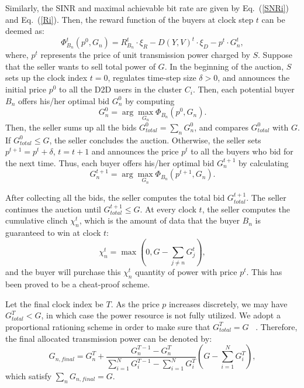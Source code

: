 \documentclass[11pt,draftcls]{IEEEtran}{\onecolumn}
\begin{document}
Similarly, the SINR and maximal achievable bit rate are given by Eq.~(\ref{SNRi}) and Eq.~(\ref{Ri}). Then, the reward function of the buyers at clock step $t$ can be deemed as:
\begin{equation}
\Phi_{B_n}^t(p^0,G_n)=R_{B_n}^{t}\cdot \xi_R-D(Y,V)^{t}\cdot\xi_D-p^{t}\cdot G_{n}^{t},
\end{equation}
where, $p^{t}$ represents the price of unit transmission power charged by $S$.
Suppose that the seller wants to sell total power of $G$. In the beginning of the auction, $S$ sets up the clock index $t=0$, regulates time-step size $\delta >0$, and announces the initial price $p^0$ to all the D2D users in the cluster $C_{i}$. Then, each potential buyer $B_n$ offers his/her optimal bid $G_n^0$ by computing
\begin{equation}
G_n^0=\arg \max_{G_n} \Phi_{B_n}\left(p^0,G_n\right).
\end{equation}
Then, the seller sums up all the bids $G_{total}^0=\sum_n {G_n^0}$, and compares $G_{total}^0$ with $G$. If $G_{total}^0 \leq G$, the seller concludes the auction. Otherwise, the seller sets $p^{t+1}=p^t+\delta$, $t=t+1$ and announces the price $p^t$ to all the buyers who bid for the next time. Thus, each buyer offers his/her optimal bid $G_n^{t+1}$ by calculating
\begin{equation}
G_n^{t+1}=\arg \max_{G_n} \Phi_{B_n}\left(p^{t+1},G_n\right).
\end{equation}

After collecting all the bids, the seller computes the total bid $G_{total}^{t+1}$. The seller continues the auction until $G_{total}^{t+1} \leq G$. At every clock $t$, the seller computes the cumulative clinch $\chi_n^t$, which is the amount of data that the buyer $B_{n}$ is guaranteed to win at clock $t$:
\begin{equation}
\chi_n^t=\max \left(0,G-\sum_{j \neq n}{G_j^t}\right),
\end{equation}
and the buyer will purchase this $\chi_n^t$ quantity of power with price $p^t$. This has been proved to be a cheat-proof scheme.

Let the final clock index be $T$. As the price $p$ increases discretely, we may have $G_{total}^{T} < G$, in which case the power resource is not fully utilized. We adopt a proportional rationing scheme in order to make sure that $G_{total}^{T} = G$ ~\cite{ausubel2004efficient}. Therefore, the final allocated transmission power can be denoted by:
\begin{equation}\label{Qi_final}
G_{n,final}=G_n^{T}+\frac{G_n^{T-1}-G_n^{T}}{\sum\limits_{i=1}^{N}{G_i^{T-1}}-\sum\limits_{i=1}^{N}{G_i^{T}}} \left(G-\sum\limits_{i=1}^{N}{G_i^{T}}\right),
\end{equation}
which satisfy $\sum_n{G_{n,final}}=G$.
\end{document}
